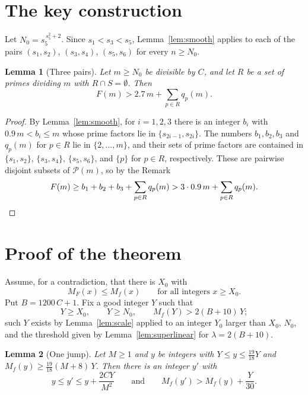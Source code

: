 \documentclass[11pt,a4paper]{amsart}
\newtheorem{lemma}{Lemma}
\theoremstyle{remark}
\begin{document}
\section{The key construction}

Let $N_0 = s_5^{\,s_5^2 + 2}$. Since $s_1 < s_3 < s_5$, Lemma~\ref{lem:smooth} applies to each of the pairs $(s_1, s_2)$, $(s_3, s_4)$, $(s_5, s_6)$ for every $n \ge N_0$.

\begin{lemma}[Three pairs]\label{lem:pairs}
Let $m \ge N_0$ be divisible by $C$, and let $R$ be a set of primes dividing $m$ with $R \cap S = \emptyset$. Then
\[
F(m) > 2.7\, m + \sum_{p \in R} q_p(m).
\]
\end{lemma}

\begin{proof}
By Lemma~\ref{lem:smooth}, for $i = 1, 2, 3$ there is an integer $b_i$ with $0.9\, m < b_i \le m$ whose prime factors lie in $\{s_{2i - 1}, s_{2i}\}$. The numbers $b_1, b_2, b_3$ and $q_p(m)$ for $p \in R$ lie in $\{2, \dots, m\}$, and their sets of prime factors are contained in $\{s_1, s_2\}$, $\{s_3, s_4\}$, $\{s_5, s_6\}$, and $\{p\}$ for $p \in R$, respectively. These are pairwise disjoint subsets of $\mathcal{P}(m)$, so by the Remark
\[
F(m) \ge b_1 + b_2 + b_3 + \sum_{p \in R} q_p(m) > 3 \cdot 0.9\, m + \sum_{p \in R} q_p(m). \qedhere
\]
\end{proof}

\section{Proof of the theorem}

Assume, for a contradiction, that there is $X_0$ with
\begin{equation}\label{eq:assumption}
M_F(x) \le M_f(x) \qquad \text{for all integers } x \ge X_0.
\end{equation}
Put $B = 1200\, C + 1$. Fix a good integer $Y$ such that
\begin{equation}\label{eq:Y}
Y \ge X_0, \qquad Y \ge N_0, \qquad M_f(Y) > 2 (B + 10)\, Y;
\end{equation}
such $Y$ exists by Lemma~\ref{lem:scale} applied to an integer $Y_0$ larger than $X_0$, $N_0$, and the threshold given by Lemma~\ref{lem:superlinear} for $\lambda = 2(B + 10)$.

\begin{lemma}[One jump]\label{lem:jump}
Let $M \ge 1$ and $y$ be integers with $Y \le y \le \frac{19}{18} Y$ and $M_f(y) \ge \frac{19}{18} (M + 8)\, Y$. Then there is an integer $y'$ with
\[
y \le y' \le y + \frac{2 C Y}{M^2} \qquad\text{and}\qquad M_f(y') > M_f(y) + \frac{Y}{30}.
\]
\end{lemma}
\end{document}
